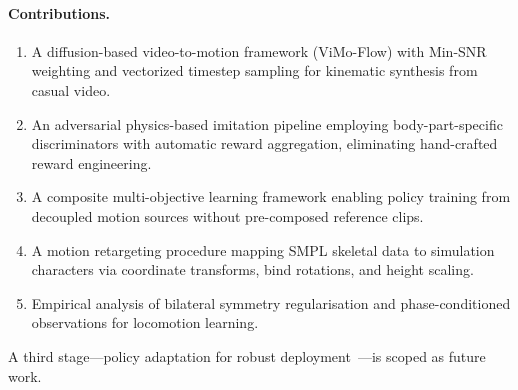\paragraph{Contributions.}
\begin{enumerate}
    \item A diffusion-based video-to-motion framework (ViMo-Flow) with Min-SNR weighting and vectorized timestep sampling for kinematic synthesis from casual video.
    \item An adversarial physics-based imitation pipeline employing body-part-specific discriminators with automatic reward aggregation, eliminating hand-crafted reward engineering.
    \item A composite multi-objective learning framework enabling policy training from decoupled motion sources without pre-composed reference clips.
    \item A motion retargeting procedure mapping SMPL skeletal data to simulation characters via coordinate transforms, bind rotations, and height scaling.
    \item Empirical analysis of bilateral symmetry regularisation and phase-conditioned observations for locomotion learning.
\end{enumerate}

A third stage---policy adaptation for robust deployment~\cite{adaptnet2023}---is scoped as future work.
